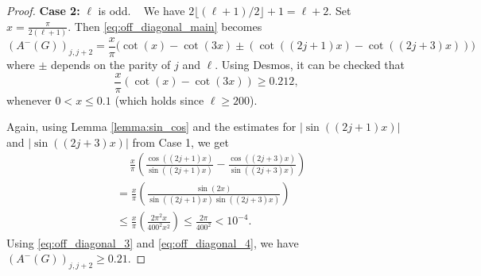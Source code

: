 \documentclass[10pt,a4paper]{amsart}
\begin{document}
\begin{proof}
\textbf{Case 2:} $\ell$ is odd. ~ 
We have $2 \lfloor (\ell + 1) / 2 \rfloor + 1 = \ell + 2.$
Set $x = \frac{\pi}{2(\ell + 1)}$. Then \eqref{eq:off_diagonal_main} becomes 
\[(A^-(G))_{j, j + 2} = \frac{x}{\pi}\bigg(\cot(x) - \cot(3x) \pm \left(\cot((2j + 1) x) - \cot((2j + 3) x)\right)\bigg)\]
where $\pm$ depends on the parity of $j$ and $\ell$. Using Desmos, it can be checked that
\begin{equation}\label{eq:off_diagonal_3}
    \frac{x}{\pi}(\cot(x)-\cot(3x))\ge 0.212, 
\end{equation}
whenever $0<x\le 0.1$ (which holds since $\ell \ge 200$).

Again, using Lemma \ref{lemma:sin_cos} and the estimates for $|\sin((2j+1)x)|$ and $|\sin((2j+3)x)|$ from Case 1, we get
\begin{align}\label{eq:off_diagonal_4}
     & \  \quad \frac{x}{\pi}\left(\frac{\cos((2j + 1) x)}{\sin((2j + 1) x)} - \frac{\cos((2j + 3) x)}{\sin((2j + 3) x)}\right) \nonumber\\
     & = \frac{x}{\pi}\left( \frac{\sin(2x)}{\sin((2j + 1) x) \sin((2j + 3) x)}\right)\nonumber\\
     & \le \frac{x}{\pi}\left(\frac{2 \pi^2 x}{400^2 x^2}\right) \le \frac{2\pi}{400^2}< 10^{-4}.
\end{align}
Using \eqref{eq:off_diagonal_3} and \eqref{eq:off_diagonal_4}, we have $(A^-(G))_{j, j + 2} \geq 0.21.$
\end{proof}
\end{document}

